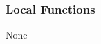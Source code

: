 \documentclass[12pt, titlepage]{article}
\begin{document}

\subsubsection{Local Functions}

None













\end{document}
